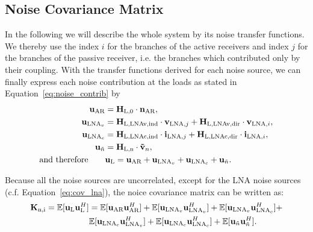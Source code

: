 \subsection{Noise Covariance Matrix}
\label{sec:sig_cov}
In the following we will describe the whole system by its noise transfer functions.
We thereby use the index $i$ for the branches of the active receivers and index $j$ for the branches of the passive receiver, i.e. the branches which contributed only by their coupling.
With the transfer functions derived for each noise source, we can finally express each noise contribution at the loads as stated in Equation~\eqref{eq:noise_contrib} by
\begin{align}
\label{eq:noise_output}
\nonumber
\mathbf{u}_\text{AR} &= \mathbf{H}_\text{L,0}\cdot\mathbf{n}_\text{AR},\\\nonumber 
\mathbf{u}_{\text{LNA}_v} &= 
	\mathbf{H}_\text{L,LNAv,ind}\cdot\mathbf{v}_{\text{LNA},j}+
	\mathbf{H}_\text{L,LNAv,dir}\cdot\mathbf{v}_{\text{LNA},i},\\\nonumber
\mathbf{u}_{\text{LNA}_c} &= 
	\mathbf{H}_\text{L,LNAc,ind}\cdot\mathbf{i}_{\text{LNA},j}+
	\mathbf{H}_\text{L,LNAc,dir}\cdot\mathbf{i}_{\text{LNA},i},\\\nonumber
\mathbf{u}_{\tilde{n}} &= \mathbf{H}_\text{L,n}\cdot\mathbf{\tilde{v}}_{n},\\
\text{and therefore}\qquad &\mathbf{u}_\text{L} = \mathbf{u}_\text{AR} + \mathbf{u}_{\text{LNA}_v} + \mathbf{u}_{\text{LNA}_c} + \mathbf{u}_{\tilde{n}}.
\end{align}

Because all the noise sources are uncorrelated, except for the LNA noise sources (c.f. Equation~\eqref{eq:cov_lna}), the noice covariance matrix can be written as:
\begin{align}
\label{eq:exp_noise}\nonumber
\mat{K}_\text{n,i} =\mathbb{E}[\vec{u}_\text{L}\vec{u}_\text{L}^H] &=
\mathbb{E}[\vec{u}_\text{AR}\vec{u}_\text{AR}^H]+ 
\mathbb{E}[\vec{u}_{\text{LNA}_v}\vec{u}_{\text{LNA}_v}^H] +
\mathbb{E}[\vec{u}_{\text{LNA}_v}\vec{u}_{\text{LNA}_c}^H] +\\%
\quad&\mathbb{E}[\vec{u}_{\text{LNA}_c}\vec{u}_{\text{LNA}_v}^H] +
\mathbb{E}[\vec{u}_{\text{LNA}_c}\vec{u}_{\text{LNA}_c}^H] +
\mathbb{E}[\vec{u}_{\tilde{n}}\vec{u}_{\tilde{n}}^H].
\end{align}

